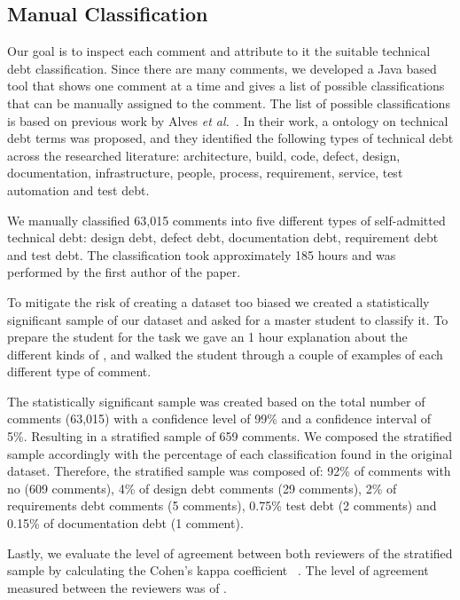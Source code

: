 
\subsection{Manual Classification} %
\label{sub:manual_classification}

Our goal is to inspect each comment and attribute to it the suitable technical debt classification. Since there are many comments, we developed a Java based tool that shows one comment at a time and gives a list of possible classifications that can be manually assigned to the comment. The list of possible classifications is based on previous work by Alves \textit{et al.}~\cite{Alves2014MTD}. In their work, a ontology on technical debt terms was proposed, and they identified the following types of technical debt across the researched literature: architecture, build, code, defect, design, documentation, infrastructure, people, process, requirement, service, test automation and test debt. 

We manually classified 63,015 comments into five different types of self-admitted technical debt: design debt, defect debt, documentation debt, requirement debt and test debt. The classification took approximately 185 hours and was performed by the first author of the paper.  

To mitigate the risk of creating a dataset too biased we created a statistically significant sample of our dataset and asked for a master student to classify it. To prepare the student for the task we gave an 1 hour explanation about the different kinds of \SATD, and walked the student through a couple of examples of each different type of \SATD comment. 

The statistically significant sample was created based on the total number of comments (63,015) with a confidence level of 99\% and a confidence interval of 5\%. Resulting in a stratified sample of 659 comments. We composed the stratified sample accordingly with the percentage of each classification found in the original dataset. Therefore, the stratified sample was composed of: 92\% of comments with no \SATD (609 comments), 4\% of design debt comments (29 comments), 2\% of requirements debt comments (5 comments), 0.75\% test debt (2 comments) and 0.15\% of documentation debt (1 comment).

Lastly, we evaluate the level of agreement between both reviewers of the stratified sample by calculating the Cohen's kappa coefficient ~\cite{cohen1960coefficient}. The level of agreement measured between the reviewers was of \todo{}.   
 

